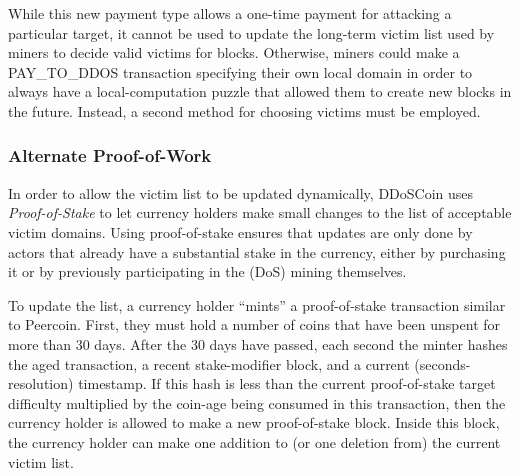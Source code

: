While this new payment type allows a one-time payment for attacking a particular
target, it cannot be used to update the long-term victim list used by miners to
decide valid victims for blocks. Otherwise, miners could make a PAY\_TO\_DDOS
transaction specifying their own local domain in order to always have a
local-computation puzzle that allowed them to create new blocks in the future.
Instead, a second method for choosing victims must be employed.

%

\subsubsection{Alternate Proof-of-Work}

In order to allow the victim list to be updated dynamically, DDoSCoin uses
\emph{Proof-of-Stake} to let currency holders make small changes to the list of
acceptable victim domains. Using proof-of-stake ensures that updates are only
done by actors that already have a substantial stake in the currency, either by
purchasing it or by previously participating in the (DoS) mining themselves.

To update the list, a currency holder ``mints'' a proof-of-stake transaction
similar to Peercoin. First, they must hold a number of coins that have been
unspent for more than 30 days. After the 30 days have passed, each second the
minter
hashes the aged transaction, a recent stake-modifier block, and a current
(seconds-resolution) timestamp. If this hash is less than the current
proof-of-stake target difficulty multiplied by the coin-age being consumed in
this transaction, then the currency holder is allowed to make a new
proof-of-stake block. Inside this block, the currency holder can make one
addition to (or one deletion from) the current victim list.

